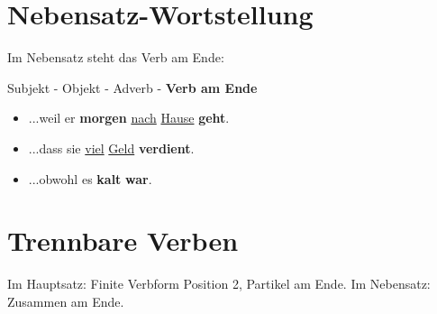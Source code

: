 \section{Nebensatz-Wortstellung}
\label{sec:Nebensatz}

Im Nebensatz steht das Verb am Ende:

\begin{tcolorbox}[title=Nebensatz]
\begin{center}
Subjekt - Objekt - Adverb - \textbf{Verb am Ende}
\end{center}
\end{tcolorbox}

\begin{itemize}
    \item ...weil er \textbf{morgen} \underline{nach} \underline{Hause} \textbf{geht}.
    \item ...dass sie \underline{viel} \underline{Geld} \textbf{verdient}.
    \item ...obwohl es \textbf{kalt} \textbf{war}.
\end{itemize}

\section{Trennbare Verben}
\label{sec:Trennbar}

Im Hauptsatz: Finite Verbform Position 2, Partikel am Ende.
Im Nebensatz: Zusammen am Ende.


